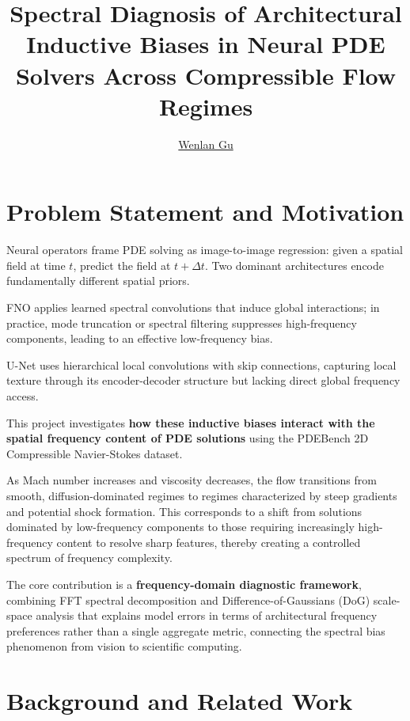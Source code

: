 \documentclass{article}
\title{Spectral Diagnosis of Architectural Inductive Biases in Neural PDE Solvers Across Compressible Flow Regimes}
\author{\href{mailto:wg2139@nyu.edu}{Wenlan Gu}}
\date{\vspace{-5ex}} %
\begin{document}
\maketitle
\thispagestyle{firstpage}

\section*{Problem Statement and Motivation}

Neural operators frame PDE solving as image-to-image regression: given a spatial field at time $t$, predict the field at $t + \Delta t$. Two dominant architectures encode fundamentally different spatial priors.

FNO applies learned spectral convolutions that induce global interactions; in practice, mode truncation or spectral filtering suppresses high-frequency components, leading to an effective low-frequency bias.

U-Net uses hierarchical local convolutions with skip connections, capturing local texture through its encoder-decoder structure but lacking direct global frequency access.

This project investigates \textbf{how these inductive biases interact with the spatial frequency content of PDE solutions} using the PDEBench 2D Compressible Navier-Stokes dataset.

As Mach number increases and viscosity decreases, the flow transitions from smooth, diffusion-dominated regimes to regimes characterized by steep gradients and potential shock formation. This corresponds to a shift from solutions dominated by low-frequency components to those requiring increasingly high-frequency content to resolve sharp features, thereby creating a controlled spectrum of frequency complexity.

The core contribution is a \textbf{frequency-domain diagnostic framework}, combining FFT spectral decomposition and Difference-of-Gaussians (DoG) scale-space analysis that explains model errors in terms of architectural frequency preferences rather than a single aggregate metric, connecting the spectral bias phenomenon from vision to scientific computing.

\section*{Background and Related Work}
\end{document}
